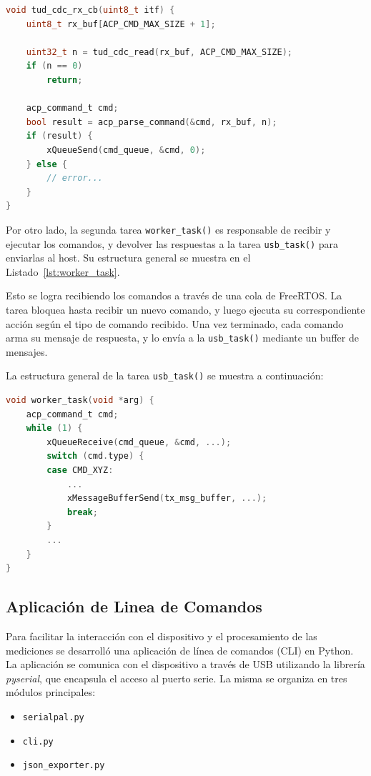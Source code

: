 \documentclass[12pt,a4paper,fleqn]{article}
\begin{document}
\begin{lstlisting}[language=c,caption={Callback para recibir e interpretar comandos recibidos desde el host.}, label={lst:usb_callback}]
void tud_cdc_rx_cb(uint8_t itf) {
    uint8_t rx_buf[ACP_CMD_MAX_SIZE + 1];

    uint32_t n = tud_cdc_read(rx_buf, ACP_CMD_MAX_SIZE);
    if (n == 0)
        return;

    acp_command_t cmd;
    bool result = acp_parse_command(&cmd, rx_buf, n);
    if (result) {
        xQueueSend(cmd_queue, &cmd, 0);
    } else {
        // error...
    }
}
\end{lstlisting}

Por otro lado, la segunda tarea \verb|worker_task()| es responsable de recibir y ejecutar los comandos, y devolver las respuestas a la tarea \verb|usb_task()| para enviarlas al host. Su estructura general se muestra en el Listado~\ref{lst:worker_task}.

Esto se logra recibiendo los comandos a través de una cola de FreeRTOS. La tarea bloquea hasta recibir un nuevo comando, y luego ejecuta su correspondiente acción según el tipo de comando recibido. Una vez terminado, cada comando arma su mensaje de respuesta, y lo envía a la \verb|usb_task()| mediante un buffer de mensajes. 

La estructura general de la tarea \verb|usb_task()| se muestra a continuación:

\begin{lstlisting}[language=c, caption={Estructura de la tarea procesadora.}, label={lst:worker_task}]
void worker_task(void *arg) {
    acp_command_t cmd;
    while (1) {
        xQueueReceive(cmd_queue, &cmd, ...);
        switch (cmd.type) {
        case CMD_XYZ:
            ...
            xMessageBufferSend(tx_msg_buffer, ...);
            break;
        }
        ...
    }
}
\end{lstlisting}

\subsection{Aplicación de Linea de Comandos} \label{sec:aplicacion_CLI}
Para facilitar la interacción con el dispositivo y el procesamiento de las mediciones se desarrolló una aplicación de línea de comandos (CLI) en Python. La aplicación se comunica con el dispositivo a través de USB utilizando la librería \textit{pyserial}, que encapsula el acceso al puerto serie. 
La misma se organiza en tres módulos principales:
\begin{itemize}
    \item \verb|serialpal.py|
    \item \verb|cli.py|
    \item \verb|json_exporter.py|
\end{itemize}
\end{document}
